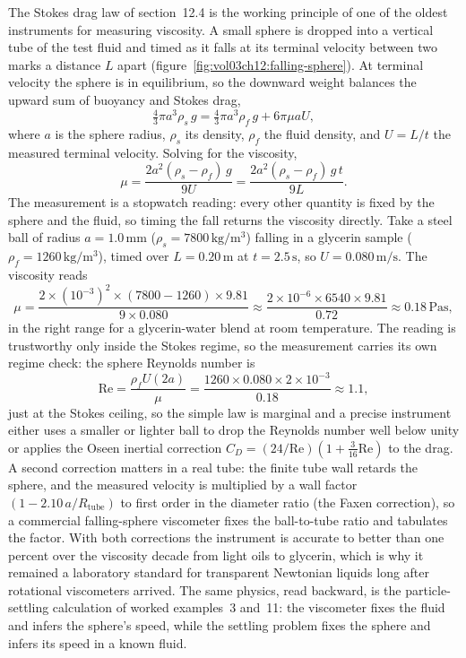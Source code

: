 The Stokes drag law of section~12.4 is the working principle of one of
the oldest instruments for measuring viscosity. A small sphere is
dropped into a vertical tube of the test fluid and timed as it falls at
its terminal velocity between two marks a distance $L$ apart
(figure~\ref{fig:vol03ch12:falling-sphere}). At terminal velocity the
sphere is in equilibrium, so the downward weight balances the upward
sum of buoyancy and Stokes drag,
\[
\tfrac{4}{3}\pi a^3\rho_s\,g = \tfrac{4}{3}\pi a^3\rho_f\,g + 6\pi\mu
a U,
\]
where $a$ is the sphere radius, $\rho_s$ its density, $\rho_f$ the
fluid density, and $U = L/t$ the measured terminal velocity. Solving
for the viscosity,
\[
\mu = \frac{2 a^2(\rho_s - \rho_f)\,g}{9 U} = \frac{2 a^2(\rho_s -
\rho_f)\,g\,t}{9 L}.
\]
The measurement is a stopwatch reading: every other quantity is fixed
by the sphere and the fluid, so timing the fall returns the viscosity
directly. Take a steel ball of radius $a = 1.0\,\si{\milli\meter}$
($\rho_s = 7800\,\si{\kilogram\per\meter\cubed}$) falling in a glycerin
sample ($\rho_f = 1260\,\si{\kilogram\per\meter\cubed}$), timed over
$L = 0.20\,\si{\meter}$ at $t = 2.5\,\si{\second}$, so $U = 0.080\,\si{
\meter\per\second}$. The viscosity reads
\[
\mu = \frac{2\times(10^{-3})^2\times(7800 - 1260)\times9.81}{9\times
0.080} \approx \frac{2\times10^{-6}\times6540\times9.81}{0.72} \approx
0.18\,\si{\pascal\second},
\]
in the right range for a glycerin-water blend at room temperature. The
reading is trustworthy only inside the Stokes regime, so the
measurement carries its own regime check: the sphere Reynolds number is
\[
\text{Re} = \frac{\rho_f U (2a)}{\mu} = \frac{1260\times0.080\times
2\times10^{-3}}{0.18} \approx 1.1,
\]
just at the Stokes ceiling, so the simple law is marginal and a precise
instrument either uses a smaller or lighter ball to drop the Reynolds
number well below unity or applies the Oseen inertial correction
$C_D = (24/\text{Re})(1 + \tfrac{3}{16}\text{Re})$ to the drag. A
second correction matters in a real tube: the finite tube wall retards
the sphere, and the measured velocity is multiplied by a wall factor
$(1 - 2.10\,a/R_{\text{tube}})$ to first order in the diameter ratio
(the Faxen correction), so a commercial falling-sphere viscometer fixes
the ball-to-tube ratio and tabulates the factor. With both corrections
the instrument is accurate to better than one percent over the
viscosity decade from light oils to glycerin, which is why it remained
a laboratory standard for transparent Newtonian liquids long after
rotational viscometers arrived. The same physics, read backward, is the
particle-settling calculation of worked examples~3 and~11: the
viscometer fixes the fluid and infers the sphere's speed, while the
settling problem fixes the sphere and infers its speed in a known
fluid.

